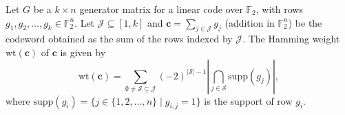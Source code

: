 \documentclass[10pt,a4paper]{amsart}
\begin{document}
\begin{lemma}\label{lem:pie}
Let $G$ be a $k \times n$ generator matrix for a linear code over $\mathbb{F}_2$, with rows $g_1, g_2, \dots, g_k \in \mathbb{F}_2^n$. Let $\mathcal{J} \subseteq [1,k]$ and $\mathbf{c} = \sum_{j \in \mathcal{J}} g_j$ (addition in $\mathbb{F}_2^n$) be the codeword obtained as the sum of the rows indexed by $\mathcal{J}$. The Hamming weight $\mathrm{wt}(\mathbf{c})$ of $\mathbf{c}$ is given by
\begin{equation}\label{eq:pie_codeword}
\boxed{\;\mathrm{wt}(\mathbf{c}) = \sum_{\emptyset \neq \mathcal{S} \subseteq \mathcal{J}} (-2)^{|\mathcal{S}|-1} \left| \bigcap_{j \in \mathcal{S}} \mathrm{supp}(g_j) \right|,\;}
\end{equation}
where $\mathrm{supp}(g_i) = \{ j \in \{1,2,\dots,n\} \mid g_{i,j} = 1 \}$ is the support of row $g_i$.
\end{lemma}
\end{document}
